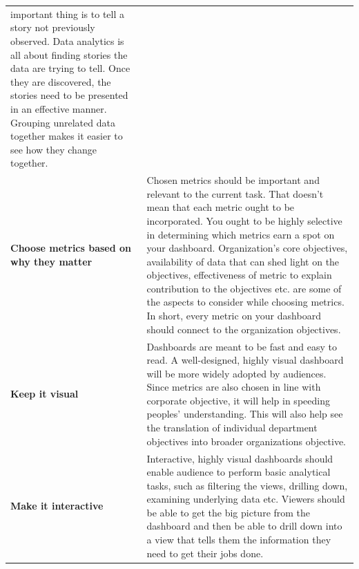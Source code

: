 \documentclass[]{book}
\theoremstyle{definition}
\theoremstyle{definition}
\theoremstyle{definition}
\theoremstyle{remark}
\begin{document}
\begin{longtable}[]{@{}ll@{}}
\begin{minipage}[t]{0.72\columnwidth}
important thing is to tell a story not previously observed. Data
analytics is all about finding stories the data are trying to tell. Once
they are discovered, the stories need to be presented in an effective
manner. Grouping unrelated data together makes it easier to see how they
change together.\strut
\end{minipage}\tabularnewline
\begin{minipage}[t]{0.17\columnwidth}\raggedright\strut
\textbf{Choose metrics based on why they matter}\strut
\end{minipage} & \begin{minipage}[t]{0.72\columnwidth}\raggedright\strut
Chosen metrics should be important and relevant to the current task.
That doesn't mean that each metric ought to be incorporated. You ought
to be highly selective in determining which metrics earn a spot on your
dashboard. Organization's core objectives, availability of data that can
shed light on the objectives, effectiveness of metric to explain
contribution to the objectives etc. are some of the aspects to consider
while choosing metrics. In short, every metric on your dashboard should
connect to the organization objectives.\strut
\end{minipage}\tabularnewline
\begin{minipage}[t]{0.17\columnwidth}\raggedright\strut
\textbf{Keep it visual}\strut
\end{minipage} & \begin{minipage}[t]{0.72\columnwidth}\raggedright\strut
Dashboards are meant to be fast and easy to read. A well-designed,
highly visual dashboard will be more widely adopted by audiences. Since
metrics are also chosen in line with corporate objective, it will help
in speeding peoples' understanding. This will also help see the
translation of individual department objectives into broader
organizations objective.\strut
\end{minipage}\tabularnewline
\begin{minipage}[t]{0.17\columnwidth}\raggedright\strut
\textbf{Make it interactive}\strut
\end{minipage} & \begin{minipage}[t]{0.72\columnwidth}\raggedright\strut
Interactive, highly visual dashboards should enable audience to perform
basic analytical tasks, such as filtering the views, drilling down,
examining underlying data etc. Viewers should be able to get the big
picture from the dashboard and then be able to drill down into a view
that tells them the information they need to get their jobs done.\strut

\end{minipage}
\end{longtable}
\end{document}
